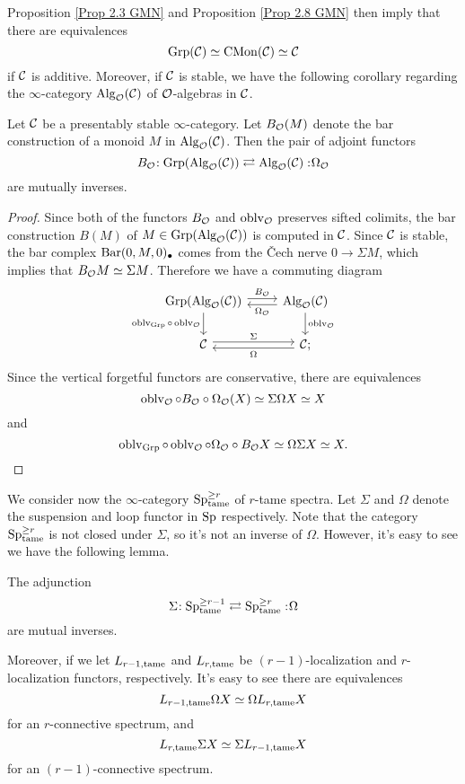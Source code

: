 Proposition \ref{Prop 2.3 GMN} and Proposition \ref{Prop 2.8 GMN} then imply that 
there are equivalences
$$
\operatorname{Grp}({\mathcal{C}})\simeq\operatorname{CMon}({\mathcal{C}}) \simeq {\mathcal{C}}
$$
if ${\mathcal{C}}$ is additive. Moreover, if ${\mathcal{C}}$ is stable, we have the following corollary regarding the $\infty$-category $\operatorname{Alg}_{{\mathcal{O}}}({\mathcal{C}})$ of ${\mathcal{O}}$-algebras in ${\mathcal{C}}$.
\begin{corollary}
    Let ${\mathcal{C}}$ be a presentably stable $\infty$-category.
    Let $B_{{\mathcal{O}}}(M)$ denote the bar construction of a monoid $M$ in $\operatorname{Alg}_{{\mathcal{O}}}({\mathcal{C}})$.
    Then the pair of adjoint functors
$$
B_{{\mathcal{O}}}\negmedspace: \operatorname{Grp}(\operatorname{Alg}_{{\mathcal{O}}}({\mathcal{C}}))\rightleftarrows \operatorname{Alg}_{{\mathcal{O}}}({\mathcal{C}}):\negmedspace \Omega_{{\mathcal{O}}}
$$
are mutually inverses.
\end{corollary}
\label{Alg(C) equivalent to groups in Alg(C)}
\begin{proof}
    Since both of the functors $B_{{\mathcal{O}}}$ and $\operatorname{oblv}_{{\mathcal{O}}}$ preserves sifted colimits, the bar construction $B(M)$ of $M\in \operatorname{Grp}(\operatorname{Alg}_{{\mathcal{O}}}({\mathcal{C}}))$ is computed in ${\mathcal{C}}$.
    Since ${\mathcal{C}}$ is stable, the bar complex $\operatorname{Bar}(0, M, 0)_{\bullet}$ comes from the \v{C}ech nerve $0 \to \Sigma M$, which implies that
    $B_{{\mathcal{O}}}M \simeq \Sigma M$.
    Therefore we have a commuting diagram
	\[
	\begin{tikzcd}
		\Grp(\Alg_{\CO}(\CC)) & \Alg_{\CO}(\CC) \\
		\CC &
		\CC ;
		\arrow[from=1-1, to=1-2, "B_{\CO}", shift left]
		\arrow[from=1-2, to=1-1, "\Omega_{\CO}", shift left]
		\arrow[from=1-1, to=2-1, "\oblv_{\Grp}\circ \oblv_{\CO}" left]
		\arrow[from=1-2, to=2-2, "\oblv_{\CO}"]
		\arrow[from=2-1, to=2-2, "\Sigma", shift left]
		\arrow[from=2-2, to=2-1, "\Omega", shift left]
	\end{tikzcd}
	\]
	Since the vertical forgetful functors are conservative, there are equivalences
$$	    
\operatorname{oblv}_{{\mathcal{O}}}\circ B_{{\mathcal{O}}} \circ  \Omega_{{\mathcal{O}}} (X)
	    \simeq \Sigma \Omega X \simeq X
$$
and 
$$
\operatorname{oblv}_{\operatorname{Grp}}\circ \operatorname{oblv}_{{\mathcal{O}}} \circ \Omega_{{\mathcal{O}}} \circ B_{{\mathcal{O}}} X 
\simeq 
\Omega \Sigma X
\simeq
X.
$$
\end{proof}




We consider now the $\infty$-category $\operatorname{Sp}^{\geq r}_{\operatorname{\operatorname{tame}}}$ of $r$-tame spectra.
Let $\Sigma$ and $\Omega$ denote the suspension and loop functor in $\operatorname{Sp}$ respectively.
Note that the category $\operatorname{Sp}^{\geq r}_{\operatorname{\operatorname{tame}}}$ is not closed under $\Sigma$, so it's not an inverse of $\Omega$.
However, it's easy to see we have the following lemma.
\begin{lemma}
\label{Relations between different tameness}
	The adjunction
	\[
	\Sigma\negmedspace: \operatorname{Sp}^{\geq r-1}_{\operatorname{\operatorname{tame}}}\rightleftarrows \operatorname{Sp}^{\geq r}_{\operatorname{\operatorname{tame}}}:\negmedspace \Omega
	\]
	are mutual inverses.
\end{lemma} 
Moreover, if we let $L_{r-1, \operatorname{\operatorname{tame}}}$ and $L_{r, \operatorname{\operatorname{tame}}}$ be $(r-1)$-localization and $r$-localization functors, respectively.
It's easy to see there are equivalences
$$
L_{r-1, \operatorname{\operatorname{tame}}} \Omega X \simeq \Omega L_{r, \operatorname{\operatorname{tame}}}X
$$
for an $r$-connective spectrum, and 
$$
L_{r, \operatorname{\operatorname{tame}}} \Sigma X \simeq \Sigma L_{r-1, \operatorname{\operatorname{tame}}}X
$$
for an $(r-1)$-connective spectrum.


